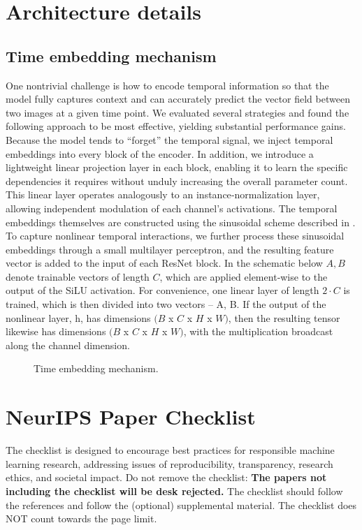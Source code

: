 \documentclass{article}
\begin{document}
\newpage
\section{Architecture details}
\subsection{Time embedding mechanism}
One nontrivial challenge is how to encode temporal information so that the model fully captures context and can accurately predict the vector field between two images at a given time point. We evaluated several strategies and found the following approach to be most effective, yielding substantial performance gains. Because the model tends to “forget” the temporal signal, we inject temporal embeddings into every block of the encoder. In addition, we introduce a lightweight linear projection layer in each block, enabling it to learn the specific dependencies it requires without unduly increasing the overall parameter count. This linear layer operates analogously to an instance‐normalization layer, allowing independent modulation of each channel’s activations. The temporal embeddings themselves are constructed using the sinusoidal scheme described in \citep{vaswani2017attention}. To capture nonlinear temporal interactions, we further process these sinusoidal embeddings through a small multilayer perceptron, and the resulting feature vector is added to the input of each ResNet block. 
In the schematic below $A, B$ denote trainable vectors of length $C$, which are applied element‐wise to the output of the SiLU activation. For convenience, one linear layer of length $2\cdot C$ is trained, which is then divided into two vectors -- A, B. 
If the output of the nonlinear layer,  h, has dimensions $(B$ x $C$ x $H$ x $W)$, then the resulting tensor likewise has dimensions $(B$ x $C$ x $H$ x $W)$, with the multiplication broadcast along the channel dimension.

\begin{figure}[h!]
  \centering
  \caption{Time embedding mechanism.}
\end{figure}



\newpage


\newpage
\section*{NeurIPS Paper Checklist}
The checklist is designed to encourage best practices for responsible machine learning research, addressing issues of reproducibility, transparency, research ethics, and societal impact. Do not remove the checklist: {\bf The papers not including the checklist will be desk rejected.} The checklist should follow the references and follow the (optional) supplemental material.  The checklist does NOT count towards the page
limit. 
\end{document}
